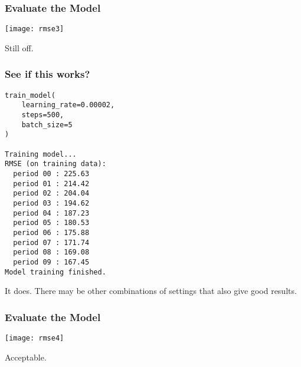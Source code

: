 \begin{frame}[fragile]\frametitle{Evaluate the Model}
\begin{center}
\texttt{[image: rmse3]}
\end{center}
Still off. 
\end{frame}

\begin{frame}[fragile]\frametitle{See if this works?}
\begin{lstlisting}
train_model(
    learning_rate=0.00002,
    steps=500,
    batch_size=5
)

Training model...
RMSE (on training data):
  period 00 : 225.63
  period 01 : 214.42
  period 02 : 204.04
  period 03 : 194.62
  period 04 : 187.23
  period 05 : 180.53
  period 06 : 175.88
  period 07 : 171.74
  period 08 : 169.08
  period 09 : 167.45
Model training finished.
\end{lstlisting}
It does. There may be other combinations of settings that also give good results.
\end{frame}

\begin{frame}[fragile]\frametitle{Evaluate the Model}
\begin{center}
\texttt{[image: rmse4]}
\end{center}
Acceptable.
\end{frame}


